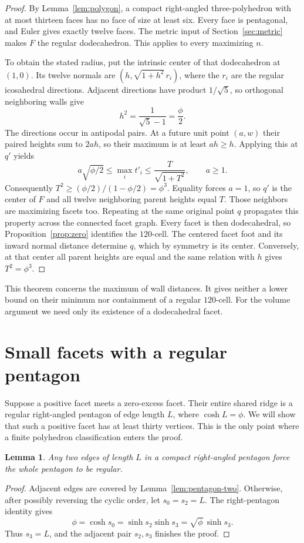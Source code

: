 \documentclass[11pt]{article}
\newtheorem{lemma}[theorem]{Lemma}
\theoremstyle{remark}
\begin{document}
\begin{proof}
By Lemma~\ref{lem:polygon}, a compact right-angled three-polyhedron
with at most thirteen faces has no face of size at least six. Every
face is pentagonal, and Euler gives exactly twelve faces. The metric
input of Section~\ref{sec:metric} makes $F$ the regular dodecahedron.
This applies to every maximizing $n$.

To obtain the stated radius, put the intrinsic center of that
dodecahedron at $(1,0)$. Its twelve normals are
$(h,\sqrt{1+h^2}\,r_i)$, where the $r_i$ are the regular icosahedral
directions. Adjacent directions have product $1/\sqrt5$, so orthogonal
neighboring walls give
\[
 h^2=\frac1{\sqrt5-1}=\frac\phi2.
\]
The directions occur in antipodal pairs. At a future unit point
$(a,w)$ their paired heights sum to $2ah$, so their maximum is at
least $ah\ge h$. Applying this at $q'$ yields
\[
 a\sqrt{\phi/2}\le\max_i t'_i
       \le\frac{T}{\sqrt{1+T^2}},\qquad a\ge1.
\]
Consequently $T^2\ge(\phi/2)/(1-\phi/2)=\phi^3$.
Equality forces $a=1$, so $q'$ is the center of $F$ and all twelve
neighboring parent heights equal $T$. Those neighbors are maximizing
facets too. Repeating at the same original point $q$ propagates this
property across the connected facet graph. Every facet is then
dodecahedral, so Proposition~\ref{prop:zero} identifies the $120$-cell.
The centered facet foot and its inward normal distance determine $q$,
which by symmetry is its center. Conversely, at that center all parent
heights are equal and the same relation with $h$ gives $T^2=\phi^3$.
\end{proof}

This theorem concerns the maximum of wall distances. It gives neither
a lower bound on their minimum nor containment of a regular $120$-cell.
For the volume argument we need only its existence of a dodecahedral
facet.

\section{Small facets with a regular pentagon}\label{sec:small-facets}

Suppose a positive facet meets a zero-excess facet. Their entire shared
ridge is a regular right-angled pentagon of edge length $L$, where
$\cosh L=\phi$. We will show that such a positive facet has at least
thirty vertices. This is the only point where a finite polyhedron
classification enters the proof.

\begin{lemma}\label{lem:any-two-pentagon}
Any two edges of length $L$ in a compact right-angled pentagon force
the whole pentagon to be regular.
\end{lemma}
\begin{proof}
Adjacent edges are covered by Lemma~\ref{lem:pentagon-two}. Otherwise,
after possibly reversing the cyclic order, let $s_0=s_2=L$. The
right-pentagon identity gives
\[
 \phi=\cosh s_0=\sinh s_2\sinh s_3
                 =\sqrt\phi\,\sinh s_3.
\]
Thus $s_3=L$, and the adjacent pair $s_2,s_3$ finishes the proof.
\end{proof}
\end{document}
